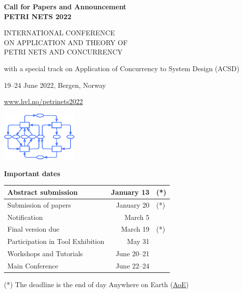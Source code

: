 \documentclass[10pt,a4paper]{article}
\begin{document}
\begin{multicols}{2}
\begin{center}
{\large\bf
Call for Papers and Announcement \\
\smallskip PETRI NETS 2022

\bigskip

 INTERNATIONAL CONFERENCE\\
ON APPLICATION AND THEORY OF \\
PETRI NETS AND CONCURRENCY

\smallskip

with a special track on Application of Concurrency to System Design (ACSD)
\bigskip

19--24 June 2022, Bergen, Norway}

\smallskip

\url{www.hvl.no/petrinets2022}

\smallskip

\end{center}

\columnbreak

\begin{center}
\includegraphics[height=2.5cm]{logos/LogoPN.pdf}

{\bf Important dates}

\begin{tabular}{|l|r@{, 2022 }l|}
\hline
Abstract submission & January 13 & (*) \\
\hline
Submission of papers & January 20 & (*) \\
\hline
Notification & March 5 & \\
\hline
Final version due & March 19 & (*) \\
\hline
Participation in Tool Exhibition & May 31 & \\
\hline
Workshops and Tutorials & June 20--21 & \\
\hline
Main Conference & June 22--24 & \\
\hline
\end{tabular}

{\small (*) The deadline is the end of day Anywhere on Earth (\href{https://en.wikipedia.org/wiki/Anywhere_on_Earth}{AoE})}
\end{center}
\end{multicols}
\end{document}
